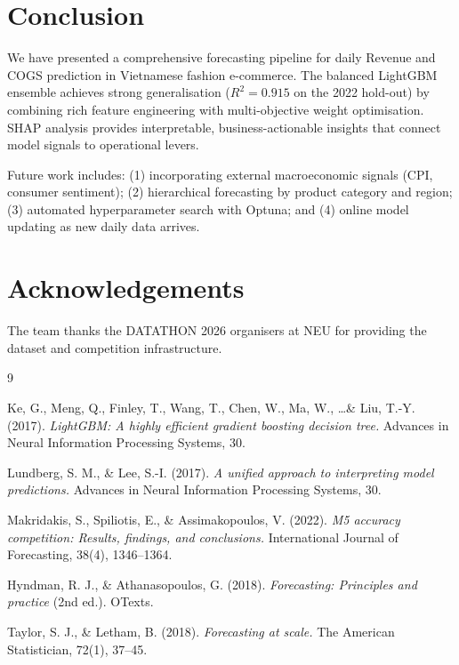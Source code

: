 \documentclass[10pt,a4paper]{article}
\begin{document}
\section{Conclusion}
\label{sec:conclusion}

We have presented a comprehensive forecasting pipeline for daily Revenue and
COGS prediction in Vietnamese fashion e-commerce.
The balanced LightGBM ensemble achieves strong generalisation
($R^2 = 0.915$ on the 2022 hold-out) by combining rich feature engineering
with multi-objective weight optimisation.
SHAP analysis provides interpretable, business-actionable insights that
connect model signals to operational levers.

Future work includes: (1) incorporating external macroeconomic signals
(CPI, consumer sentiment); (2) hierarchical forecasting by product category
and region; (3) automated hyperparameter search with Optuna;
and (4) online model updating as new daily data arrives.

\section*{Acknowledgements}
The team thanks the DATATHON 2026 organisers at NEU for providing the
dataset and competition infrastructure.


\begin{thebibliography}{9}

Ke, G., Meng, Q., Finley, T., Wang, T., Chen, W., Ma, W., \ldots \& Liu, T.-Y. (2017).
\textit{LightGBM: A highly efficient gradient boosting decision tree.}
Advances in Neural Information Processing Systems, 30.

Lundberg, S. M., \& Lee, S.-I. (2017).
\textit{A unified approach to interpreting model predictions.}
Advances in Neural Information Processing Systems, 30.

Makridakis, S., Spiliotis, E., \& Assimakopoulos, V. (2022).
\textit{M5 accuracy competition: Results, findings, and conclusions.}
International Journal of Forecasting, 38(4), 1346--1364.

Hyndman, R. J., \& Athanasopoulos, G. (2018).
\textit{Forecasting: Principles and practice} (2nd ed.).
OTexts.

Taylor, S. J., \& Letham, B. (2018).
\textit{Forecasting at scale.}
The American Statistician, 72(1), 37--45.

\end{thebibliography}
\end{document}
